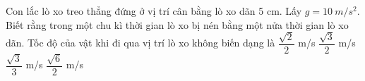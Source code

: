 \begin{vidu}%
Con lắc lò xo treo thẳng đứng ở vị trí cân bằng lò xo dãn 5 cm. Lấy $g = 10\ m/s^2$. Biết rằng trong một chu kì thời gian lò xo bị nén bằng một nửa thời gian lò xo dãn. Tốc độ của vật khi đi qua vị trí lò xo không biến dạng là
\choice
{$\dfrac{\sqrt{2}}{2}$ m/s}
{$\dfrac{\sqrt{3}}{2}$ m/s}
{$\dfrac{\sqrt{3}}{3}$ m/s}
{\True $\dfrac{\sqrt{6}}{2}$ m/s}
\end{vidu} %

